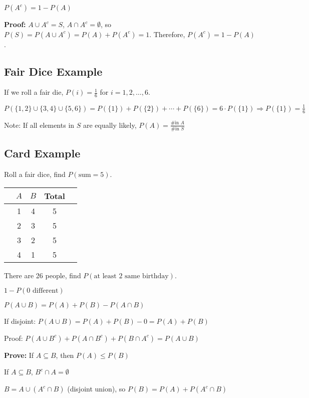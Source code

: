 \begin{lemma}
$P(A^c) = 1 - P(A)$
\end{lemma}

\textbf{Proof:} $A \cup A^c = S$, $A \cap A^c = \emptyset$, so $P(S) = P(A \cup A^c) = P(A) + P(A^c) = 1$. Therefore, $P(A^c) = 1 - P(A)$.

\subsection{Fair Dice Example}
If we roll a fair die, $P(i) = \frac{1}{6}$ for $i = 1, 2, \ldots, 6$.

$P(\{1, 2\} \cup \{3, 4\} \cup \{5, 6\}) = P(\{1\}) + P(\{2\}) + \cdots + P(\{6\}) = 6 \cdot P(\{1\}) \Rightarrow P(\{1\}) = \frac{1}{6}$

Note: If all elements in $S$ are equally likely, $P(A) = \frac{\text{\# in } A}{\text{\# in } S}$

\subsection{Card Example}
Roll a fair dice, find $P(\text{sum} = 5)$.

\begin{center}
\begin{tabular}{c|cccc}
 & $A$ & $B$ & Total \\
\hline
 & 1 & 4 & 5 \\
 & 2 & 3 & 5 \\
 & 3 & 2 & 5 \\
 & 4 & 1 & 5
\end{tabular}
\end{center}

There are 26 people, find $P(\text{at least 2 same birthday})$.

$1 - P(\text{0 different})$

\begin{lemma}
$P(A \cup B) = P(A) + P(B) - P(A \cap B)$
\end{lemma}

If disjoint: $P(A \cup B) = P(A) + P(B) - 0 = P(A) + P(B)$

Proof: $P(A \cup B^c) + P(A \cap B^c) + P(B \cap A^c) = P(A \cup B)$

\textbf{Prove:} If $A \subseteq B$, then $P(A) \leq P(B)$

If $A \subseteq B$, $B^c \cap A = \emptyset$

$B = A \cup (A^c \cap B)$ (disjoint union), so $P(B) = P(A) + P(A^c \cap B)$


